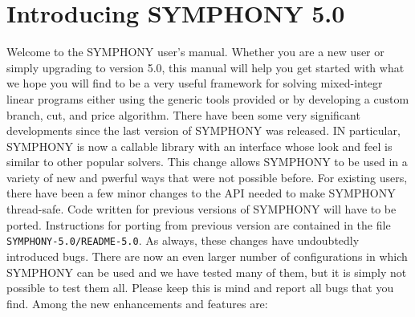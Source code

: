 \section{Introducing SYMPHONY 5.0}
\label{whats-new}

Welcome to the SYMPHONY user's manual. Whether you are a new user or simply
upgrading to version 5.0, this manual will help you get started with what we
hope you will find to be a very useful framework for solving mixed-integr
linear programs either using the generic tools provided or by developing a
custom branch, cut, and price algorithm. There have been some very significant
developments since the last version of SYMPHONY was released. IN particular,
SYMPHONY is now a callable library with an interface whose look and feel is
similar to other popular solvers. This change allows SYMPHONY to be used in a
variety of new and pwerful ways that were not possible before. For existing
users, there have been a few minor changes to the API needed to make SYMPHONY
thread-safe. Code written for previous versions of SYMPHONY will have to be
ported. Instructions for porting from previous version are contained in the
file \texttt{SYMPHONY-5.0/README-5.0}. As always, these changes have
undoubtedly introduced bugs. There are now an even larger number of
configurations in which SYMPHONY can be used and we have tested many of them,
but it is simply not possible to test them all. Please keep this is mind and
report all bugs that you find. Among the new enhancements and features are:

